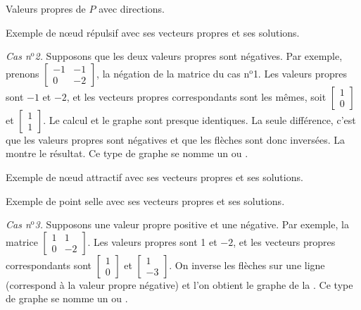 \begin{myfig}
\parbox[t]{3.0in}{
 \capstart
 \caption{Valeurs propres de $P$ avec directions.\label{pln:source-eig-arrfig}}
}
\quad
\parbox[t]{3.0in}{
 \capstart
 \caption{Exemple de nœud répulsif avec ses vecteurs propres et ses
 solutions.\label{pln:source-fullfig}}
}
\end{myfig}

\medskip

\emph{Cas n$^\text{o}$2.} Supposons que les deux valeurs propres sont négatives. Par exemple, prenons
$\left[ \begin{smallmatrix} -1 & -1 \\ 0 & -2 \end{smallmatrix} \right]$, la négation de la matrice du cas n$^\text{o}$1.
Les valeurs propres sont $-1$ et $-2$, et les vecteurs propres correspondants sont les mêmes, soit
$\left[ \begin{smallmatrix} 1 \\ 0 \end{smallmatrix} \right]$ et
$\left[ \begin{smallmatrix} 1 \\ 1 \end{smallmatrix} \right]$. Le calcul et le graphe sont presque identiques. La seule différence, c'est que les valeurs propres sont négatives et que les flèches sont donc inversées. La  montre le résultat. Ce type de graphe se nomme un \emph{} ou \emph{}.

\begin{myfig}
\parbox[t]{3.0in}{
 \capstart
 \caption{Exemple de nœud attractif avec ses vecteurs propres et ses
 solutions.\label{pln:sink-fullfig}}
}
\quad
\parbox[t]{3.0in}{
 \capstart
 \caption{Exemple de point selle avec ses vecteurs propres et ses
 solutions.\label{pln:saddle-fullfig}}
}
\end{myfig}

\medskip

\emph{Cas n$^\text{o}$3.} Supposons une valeur propre positive et une négative. Par exemple, la matrice
$\left[ \begin{smallmatrix} 1 & 1 \\ 0 & -2 \end{smallmatrix} \right]$.
Les valeurs propres sont 1 et $-2$, et les vecteurs propres correspondants sont
$\left[ \begin{smallmatrix} 1 \\ 0 \end{smallmatrix} \right]$ et
$\left[ \begin{smallmatrix} 1 \\ -3 \end{smallmatrix} \right]$. On inverse les flèches sur une ligne (correspond à la valeur propre négative) et l'on obtient le graphe de la . Ce type de graphe se nomme un \emph{} ou \emph{}.

